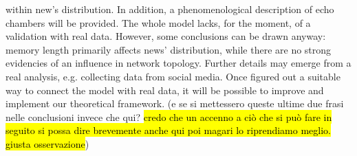 within new's distribution.
In addition, a phenomenological description of echo chambers
will be provided.
The whole model lacks, for the moment, of a validation with real data.
However, some conclusions can be drawn anyway: memory length
primarily affects news' distribution, while there are no strong
evidencies of an influence in network topology.
Further details may emerge from a real analysis, e.g. collecting data
from social media. Once figured out a suitable way to connect the model with
real data, it will be possible to improve and implement
our theoretical framework. (e se si mettessero queste ultime due frasi
nelle conclusioni invece che qui? \hl{credo che un accenno a
  ci\`o che si pu\`o fare in seguito si possa dire brevemente anche
qui poi magari lo riprendiamo meglio. giusta osservazione})
